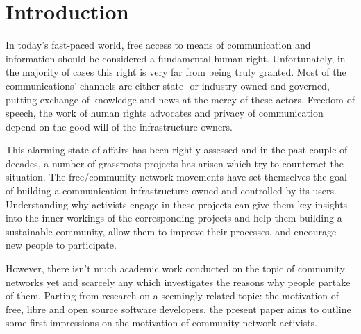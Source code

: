 \section{Introduction}

In today's fast-paced world, free access to means of communication and information should be considered a fundamental human right.
Unfortunately, in the majority of cases this right is very far from being truly granted.
Most of the communications' channels are either state- or industry-owned and governed, putting exchange of knowledge and news at the mercy of these actors.
Freedom of speech, the work of human rights advocates and privacy of communication depend on the good will of the infrastructure owners.

This alarming state of affairs has been rightly assessed and in the past couple of decades, a number of grassroots projects has arisen which try to counteract the situation.
The free/community network movements have set themselves the goal of building a communication infrastructure owned and controlled by its users.
Understanding why activists engage in these projects can give them key insights into the inner workings of the corresponding projects and help them building a sustainable community, allow them to improve their processes, and encourage new people to participate.

However, there isn't much academic work conducted on the topic of community networks yet and scarcely any which investigates the reasons why people partake of them.
Parting from research on a seemingly related topic: the motivation of free, libre and open source software developers, the present paper aims to outline some first impressions on the motivation of community network activists.

\begin{comment}
* Untersuchungsgegenstand
* Erkenntnisinteresse
* Forschungsstand
* Ergebnisse können/sollen angedeuten werden

Why is the topic relevant??

* grassroots movements
* one of the free/open movements which is relatively understudied till now
* understanding why
  ** may enhance motivation and performance (or not);
  ** or give activists insights into how to improve their processes
\end{comment}


